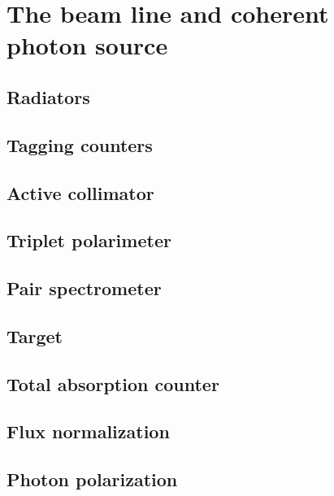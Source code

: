 
\section{The beam line and coherent photon source}
\subsection{Radiators \label{sec:radiators}}
\subsection{Tagging counters \label{sec:tag}}
\subsection{Active collimator \label{sec:coll}}
\subsection{Triplet polarimeter \label{sec:tpol}}
\subsection{Pair spectrometer \label{sec:ps}}
\subsection{Target \label{sec:target}}
\subsection{Total absorption counter \label{sec:tac}}
\subsection{Flux normalization \label{sec:fluxnorm}}
\subsection{Photon polarization \label{sec:polarization}}